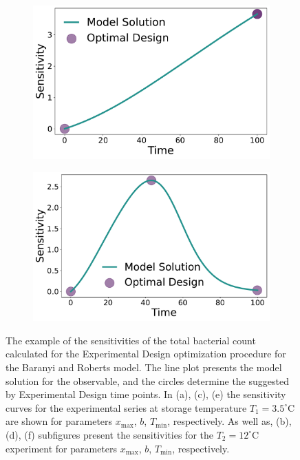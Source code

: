 \documentclass[graybox]{svmult}
\begin{document}
\begin{figure}[H]
\begin{subfigure}{.5\textwidth}
        \includegraphics[scale=0.255]{Figures/Sensitivity_Results_baranyi_roberts_ode_fisher_determinant_rel_sensit_cont_2times_2temps_000_x_00_p_02.pdf}
    \end{subfigure}
    \begin{subfigure}{.5\textwidth}
          \centering
          \includegraphics[scale=0.255]{Figures/Sensitivity_Results_baranyi_roberts_ode_fisher_determinant_rel_sensit_cont_2times_2temps_001_x_00_p_02.pdf}
        \end{subfigure}
    \caption{{\footnotesize The example of the sensitivities of the total bacterial count calculated for the Experimental Design optimization procedure for the Baranyi and Roberts model.
    The line plot presents the model solution for the observable, and the circles determine the suggested by Experimental Design time points.
    In (a), (c), (e) the sensitivity curves for the experimental series at storage temperature $T_1=3.5^\circ$C are shown for parameters $x_\text{max}$, $b$, $T_\text{min}$, respectively.
    As well as, (b), (d), (f) subfigures present the sensitivities for the $T_2=12^\circ$C experiment for parameters $x_\text{max}$, $b$, $T_\text{min}$, respectively.}}
    \label{fig:baranyi_roberts_sensitivities}
\end{figure}
\end{document}
